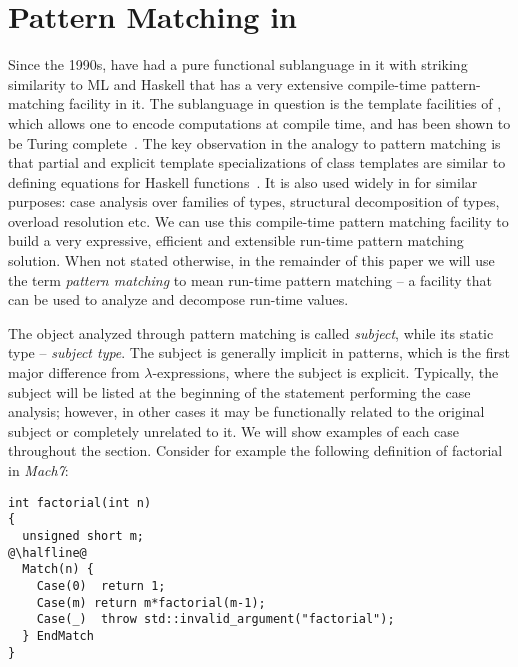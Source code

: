 \section{Pattern Matching in \Cpp{}} %
\label{sec:cpppat}

Since the 1990s, \Cpp{} have had a pure functional sublanguage in it with striking similarity 
to ML and Haskell that has a very extensive compile-time pattern-matching 
facility in it. The sublanguage in question is the template facilities of 
\Cpp{}, which allows one to encode computations at compile time, and has been 
shown to be Turing complete~\cite{veldhuizen:templates_turing_complete}.
The key observation in the analogy to pattern matching is that partial and 
explicit template specializations of \Cpp{} class templates are similar to 
defining equations for Haskell functions~\cite{Milewski11}. It is also used 
widely in \Cpp{} for similar purposes: case analysis over families of types, 
structural decomposition of types, overload resolution etc. We can use this 
compile-time pattern matching facility to build a very expressive, efficient and
extensible run-time pattern matching solution. When not stated otherwise, in the 
remainder of this paper we will use the term \emph{pattern matching} to mean 
run-time pattern matching -- a facility that can be used to analyze and 
decompose run-time values.


The object analyzed through pattern matching is called \emph{subject}, while its 
static type -- \emph{subject type}. The subject is generally implicit in 
patterns, which is the first major difference from $\lambda$-expressions, where 
the subject is explicit. Typically, the subject will be listed at the beginning 
of the statement performing the case analysis; however, in other cases it may be 
functionally related to the original subject or completely unrelated to it. We 
will show examples of each case throughout the section. Consider for example the 
following definition of factorial in \emph{Mach7}:

\begin{lstlisting}[keepspaces]
int factorial(int n)
{
  unsigned short m;
@\halfline@
  Match(n) {
    Case(0)  return 1;
    Case(m) return m*factorial(m-1);
    Case(_)  throw std::invalid_argument("factorial");
  } EndMatch
}
\end{lstlisting}

